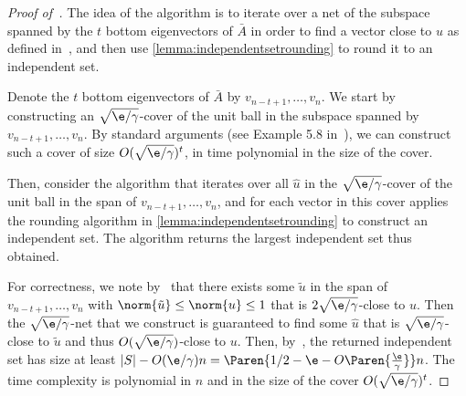 \begin{proof}[Proof of~]
The idea of the algorithm is to iterate over a net of the subspace spanned by the $t$ bottom eigenvectors of $\bar{A}$ in order to find a vector close to $u$ as defined in~, and then use \cref{lemma:independentsetrounding} to round it to an independent set.

Denote the $t$ bottom eigenvectors of $\bar{A}$ by $v_{n-t+1}, \ldots, v_n$.
We start by constructing an $\sqrt{\e/\gamma}$-cover of the unit ball in the subspace spanned by $v_{n-t+1}, \ldots, v_n$.
By standard arguments (see Example 5.8 in~\cite{MR3967104-Wainwright19}), we can construct such a cover of size $O(\sqrt{\e/\gamma})^t$, in time polynomial in the size of the cover.

Then, consider the algorithm that iterates over all $\hat{u}$ in the $\sqrt{\e/\gamma}$-cover of the unit ball in the span of $v_{n-t+1}, \ldots, v_n$, and for each vector in this cover applies the rounding algorithm in \cref{lemma:independentsetrounding} to construct an independent set.
The algorithm returns the largest independent set thus obtained.

For correctness, we note by~ that there exists some $\tilde{u}$ in the span of $v_{n-t+1}, \ldots, v_n$ with $\norm{\tilde{u}} \leq \norm{u} \leq 1$ that is $2\sqrt{\e/\gamma}$-close to $u$.
Then the $\sqrt{\e/\gamma}$-net that we construct is guaranteed to find some $\hat{u}$ that is $\sqrt{\e/\gamma}$-close to $\tilde{u}$ and thus $O(\sqrt{\e/\gamma})$-close to $u$.
Then, by~, the returned independent set has size at least $|S| - O(\e/\gamma) n = \Paren{1/2-\e - O\Paren{\frac{\e}{\gamma}}}n$.
The time complexity is polynomial in $n$ and in the size of the cover $O(\sqrt{\e/\gamma})^t$.
\end{proof}
